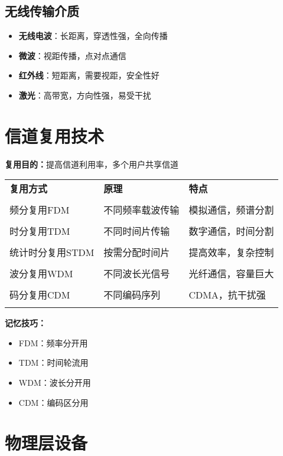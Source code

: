 \documentclass[lang=cn,newtx,10pt,scheme=chinese]{../../elegantbook}
\begin{document}
\subsection{无线传输介质}
\begin{itemize}
  \item \textbf{无线电波}：长距离，穿透性强，全向传播
  \item \textbf{微波}：视距传播，点对点通信
  \item \textbf{红外线}：短距离，需要视距，安全性好
  \item \textbf{激光}：高带宽，方向性强，易受干扰
\end{itemize}

\section{信道复用技术}

\textbf{复用目的：}提高信道利用率，多个用户共享信道

\begin{longtable}{@{}p{3cm}p{5cm}p{5cm}@{}}
\toprule
\textbf{复用方式} & \textbf{原理} & \textbf{特点} \\\\ \midrule
\endhead

频分复用FDM & 不同频率载波传输 & 模拟通信，频谱分割 \\\\
时分复用TDM & 不同时间片传输 & 数字通信，时间分割 \\\\
统计时分复用STDM & 按需分配时间片 & 提高效率，复杂控制 \\\\
波分复用WDM & 不同波长光信号 & 光纤通信，容量巨大 \\\\
码分复用CDM & 不同编码序列 & CDMA，抗干扰强 \\\\

\bottomrule
\end{longtable}

\textbf{记忆技巧：}
\begin{itemize}
  \item FDM：频率分开用
  \item TDM：时间轮流用  
  \item WDM：波长分开用
  \item CDM：编码区分用
\end{itemize}

\section{物理层设备}
\end{document}

